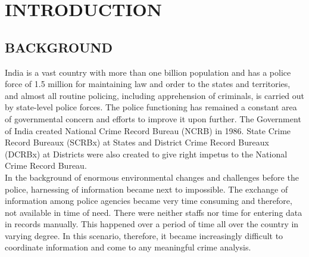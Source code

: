 \documentclass[12pt]{extreport}
\begin{document}
%

\setcounter{page}{2}
%




\newpage
\pagestyle{fancy}
\setcounter{page}{4}
\fancyhf{}
\fancyhead[LE,RO]{\textit{\leftmark}}
\fancyhead[RE,LO]{\LaTeX}
\fancyfoot[LE,RO]{\thepage}
 
\renewcommand{\headrulewidth}{2pt}
\renewcommand{\footrulewidth}{1pt}
\newpage

\listoffigures
\newpage
\listoftables
\newpage
\tableofcontents

\chapter{INTRODUCTION}
\setcounter{page}{1}
\section{BACKGROUND}
\hspace*{5em}India is a vast country with more than one billion population and has a police force of 1.5 million for maintaining law and order to the states and territories, and almost all routine policing, including apprehension of criminals, is carried out by state-level police forces. The police functioning has remained a constant area of governmental concern and efforts to improve it upon further. The Government of India created National Crime Record Bureau (NCRB) in 1986. State Crime Record Bureaux (SCRBx) at States and District Crime Record Bureaux (DCRBx) at Districts were also created to give right impetus to the National Crime Record Bureau.\\


In the background of enormous environmental changes and challenges before the police, harnessing of information became next to impossible. The exchange of information among police agencies became very time consuming and therefore, not available in time of need. There were neither staffs nor time for entering data in records manually. This happened over a period of time all over the country in varying degree. In this scenario, therefore, it became increasingly difficult to coordinate information and come to any meaningful crime analysis. \\
\end{document}
